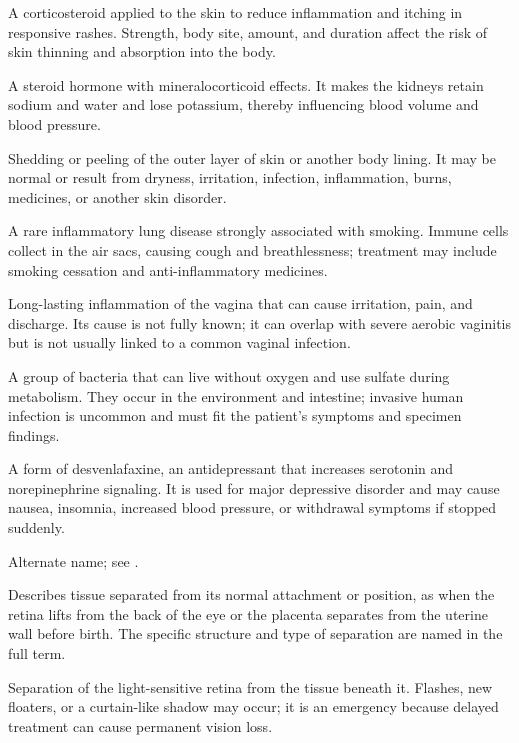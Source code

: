  A corticosteroid applied to the skin to reduce inflammation and itching in responsive rashes. Strength, body site, amount, and duration affect the risk of skin thinning and absorption into the body.

 A steroid hormone with mineralocorticoid effects. It makes the kidneys retain sodium and water and lose potassium, thereby influencing blood volume and blood pressure.

 Shedding or peeling of the outer layer of skin or another body lining. It may be normal or result from dryness, irritation, infection, inflammation, burns, medicines, or another skin disorder.

 A rare inflammatory lung disease strongly associated with smoking. Immune cells collect in the air sacs, causing cough and breathlessness; treatment may include smoking cessation and anti-inflammatory medicines.

 Long-lasting inflammation of the vagina that can cause irritation, pain, and discharge. Its cause is not fully known; it can overlap with severe aerobic vaginitis but is not usually linked to a common vaginal infection.

 A group of bacteria that can live without oxygen and use sulfate during metabolism. They occur in the environment and intestine; invasive human infection is uncommon and must fit the patient’s symptoms and specimen findings.

 A form of desvenlafaxine, an antidepressant that increases serotonin and norepinephrine signaling. It is used for major depressive disorder and may cause nausea, insomnia, increased blood pressure, or withdrawal symptoms if stopped suddenly.

 Alternate name; see .

 Describes tissue separated from its normal attachment or position, as when the retina lifts from the back of the eye or the placenta separates from the uterine wall before birth. The specific structure and type of separation are named in the full term.

 Separation of the light-sensitive retina from the tissue beneath it. Flashes, new floaters, or a curtain-like shadow may occur; it is an emergency because delayed treatment can cause permanent vision loss.

